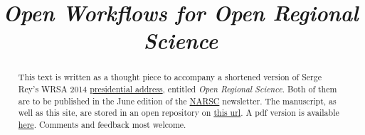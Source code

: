 
\title{\textit{Open Workflows for Open Regional Science}}
\maketitle
\renewcommand{\abstractname}{\href{http://darribas.org}{[Dani Arribas-Bel]}}
\begin{abstract}
          This text is written as a thought piece to accompany a shortened version
          of Serge Rey's WRSA 2014 \href{https://github.com/sjsrey/ors}{
          presidential address}, entitled \textit{Open Regional Science}. Both of them are to be
          published in the June edition of the \href{http://narsc.org"}{NARSC} newsletter.
          The manuscript, as well as this site, are stored in an open
          repository on \href{https://github.com/darribas/ow4ors/}{this
          url}. A pdf version is available
          \href{https://github.com/darribas/ow4ors/blob/gh-pages/ow4ors.pdf?raw=true}{here}. Comments and feedback most welcome.

\end{abstract}

